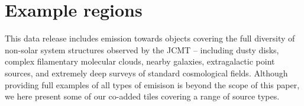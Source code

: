 \documentclass[twocolumn,times]{aastex6}
\begin{document}
\section{Example regions}
This data release includes emission towards objects covering the full
diversity of non-solar system structures observed by the JCMT --
including dusty disks, complex filamentary molecular clouds, nearby
galaxies, extragalactic point sources, and extremely deep surveys of
standard cosmological fields. Although providing full examples of all
types of emisison is beyond the scope of this paper, we here present
some of our co-added tiles covering a range of source types.
\end{document}
